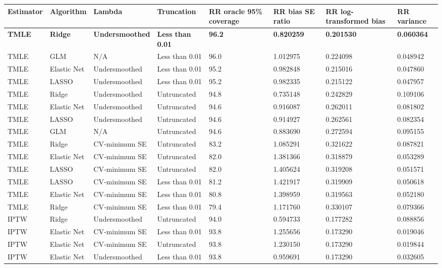 
\begin{longtable}[l]{llllllll}
\toprule
Estimator & Algorithm & Lambda & Truncation & RR oracle 95\% coverage & RR bias SE ratio & RR log-transformed bias & RR variance\\
\midrule
\midrule
\textbf{TMLE} & \textbf{Ridge} & \textbf{Undersmoothed} & \textbf{Less than 0.01} & \textbf{96.2} & \textbf{0.820259} & \textbf{0.201530} & \textbf{0.060364}\\
\midrule
TMLE & GLM & N/A & Less than 0.01 & 96.0 & 1.012975 & 0.224098 & 0.048942\\
TMLE & Elastic Net & Undersmoothed & Less than 0.01 & 95.2 & 0.982848 & 0.215016 & 0.047860\\
TMLE & LASSO & Undersmoothed & Less than 0.01 & 95.2 & 0.982335 & 0.215122 & 0.047957\\
TMLE & Ridge & Undersmoothed & Untruncated & 94.8 & 0.735148 & 0.242829 & 0.109106\\
TMLE & Elastic Net & Undersmoothed & Untruncated & 94.6 & 0.916087 & 0.262011 & 0.081802\\
TMLE & LASSO & Undersmoothed & Untruncated & 94.6 & 0.914927 & 0.262561 & 0.082354\\
TMLE & GLM & N/A & Untruncated & 94.6 & 0.883690 & 0.272594 & 0.095155\\
TMLE & Ridge & CV-minimum SE & Untruncated & 83.2 & 1.085291 & 0.321622 & 0.087821\\
TMLE & Elastic Net & CV-minimum SE & Untruncated & 82.0 & 1.381366 & 0.318879 & 0.053289\\
TMLE & LASSO & CV-minimum SE & Untruncated & 82.0 & 1.405624 & 0.319208 & 0.051571\\
TMLE & LASSO & CV-minimum SE & Less than 0.01 & 81.2 & 1.421917 & 0.319909 & 0.050618\\
TMLE & Elastic Net & CV-minimum SE & Less than 0.01 & 80.8 & 1.398959 & 0.319563 & 0.052180\\
TMLE & Ridge & CV-minimum SE & Less than 0.01 & 79.4 & 1.171760 & 0.330107 & 0.079366\\
IPTW & Ridge & Undersmoothed & Untruncated & 94.0 & 0.594733 & 0.177282 & 0.088856\\
IPTW & Elastic Net & CV-minimum SE & Less than 0.01 & 93.8 & 1.255656 & 0.173290 & 0.019046\\
IPTW & Elastic Net & CV-minimum SE & Untruncated & 93.8 & 1.230150 & 0.173290 & 0.019844\\
IPTW & Elastic Net & Undersmoothed & Less than 0.01 & 93.8 & 0.959691 & 0.173290 & 0.032605\\

\end{longtable}

